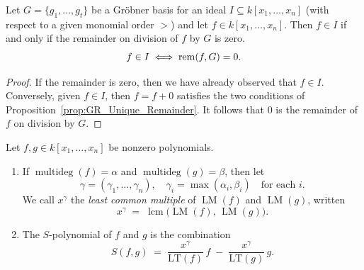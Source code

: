 \begin{corollary}
  \label{cor:GB_membership_test} %
  \leanok
  Let $G = \{g_1, \dots , g_t\}$ be a Gr{\"o}bner basis for an ideal $I \subseteq k[x_1, \dots , x_n]$
  (with respect to a given monomial order $>$) and let $f \in k[x_1, \dots , x_n]$.
  Then $f \in I$ if and only if the remainder on division of $f$ by
  $G$ is zero.
  \[ f \in I \iff \operatorname{rem}(f, G) = 0. \]
\end{corollary}
\begin{proof}
  \leanok
  If the remainder is zero, then we have already observed that $f \in I$. 
  Conversely, given $f \in I$, then $f = f + 0$ satisfies the two conditions of Proposition~\ref{prop:GR_Unique_Remainder}. 
  It follows that $0$ is the remainder of $f$ on division by $G$.
\end{proof}

\begin{definition}\label{def:sPolynomial} %
    \mathlibok 
    Let \(f,g\in k[x_1,\dots,x_n]\) be nonzero polynomials.
    \begin{enumerate}
      \item If \(\operatorname{multideg}(f)=\alpha\) and \(\operatorname{multideg}(g)=\beta\), 
        then let 
        \[
          \gamma = (\gamma_1,\dots,\gamma_n),
          \quad
          \gamma_i = \max(\alpha_i,\beta_i)
          \quad\text{for each }i.
        \]
        We call \(x^\gamma\) the \emph{least common multiple} of \(\operatorname{LM}(f)\) and \(\operatorname{LM}(g)\),
        written
        \[
          x^\gamma \;=\;\operatorname{lcm}\bigl(\operatorname{LM}(f),\,\operatorname{LM}(g)\bigr).
        \]
      \item The \(S\)-polynomial of \(f\) and \(g\) is the combination
        \[
          S(f,g)
          \;=\;
          \frac{x^\gamma}{\mathrm{LT}(f)}\,f
          \;-\;
          \frac{x^\gamma}{\mathrm{LT}(g)}\,g.
        \]
    \end{enumerate}
\end{definition}

